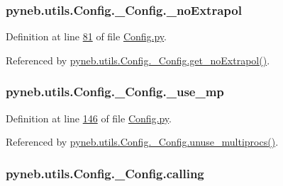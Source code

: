 \subsubsection[{\+\_\+no\+Extrapol}]{\setlength{\rightskip}{0pt plus 5cm}pyneb.\+utils.\+Config.\+\_\+\+Config.\+\_\+no\+Extrapol\hspace{0.3cm}{\ttfamily [private]}}\label{classpyneb_1_1utils_1_1_config_1_1___config_a0fd9f60b73f8af4fda56fed8c6683a1c}


Definition at line \hyperlink{_config_8py_source_l00081}{81} of file \hyperlink{_config_8py_source}{Config.\+py}.



Referenced by \hyperlink{_config_8py_source_l00083}{pyneb.\+utils.\+Config.\+\_\+\+Config.\+get\+\_\+no\+Extrapol()}.

\hypertarget{classpyneb_1_1utils_1_1_config_1_1___config_a29aefac8a5bc01cb564c9fc12755fe7c}{}
\subsubsection[{\+\_\+use\+\_\+mp}]{\setlength{\rightskip}{0pt plus 5cm}pyneb.\+utils.\+Config.\+\_\+\+Config.\+\_\+use\+\_\+mp\hspace{0.3cm}{\ttfamily [private]}}\label{classpyneb_1_1utils_1_1_config_1_1___config_a29aefac8a5bc01cb564c9fc12755fe7c}


Definition at line \hyperlink{_config_8py_source_l00146}{146} of file \hyperlink{_config_8py_source}{Config.\+py}.



Referenced by \hyperlink{_config_8py_source_l00148}{pyneb.\+utils.\+Config.\+\_\+\+Config.\+unuse\+\_\+multiprocs()}.

\hypertarget{classpyneb_1_1utils_1_1_config_1_1___config_abf04542e5670abea107260ca7a6baf6d}{}
\subsubsection[{calling}]{\setlength{\rightskip}{0pt plus 5cm}pyneb.\+utils.\+Config.\+\_\+\+Config.\+calling}\label{classpyneb_1_1utils_1_1_config_1_1___config_abf04542e5670abea107260ca7a6baf6d}


